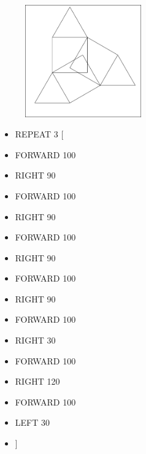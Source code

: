 \begin{minipage}{0.5\textwidth}
\begin{figure}[H]
   \includegraphics[width=5.0cm,trim=4 4 6 4,clip]{./images/marta/mar-10.png}
   \label{mar-11}
\end{figure}
\end{minipage} \hfill
\begin{minipage}{0.45\textwidth}
\begin{itemize}[itemsep=-3pt,parsep=2pt]
\item[] \hspace{0.5cm} REPEAT 3 [
\item[] \hspace{0.5cm} 	FORWARD 100
\item[] \hspace{0.5cm} 	RIGHT 90
\item[] \hspace{0.5cm} 	FORWARD 100
\item[] \hspace{0.5cm} 	RIGHT 90
\item[] \hspace{0.5cm} 	FORWARD 100
\item[] \hspace{0.5cm} 	RIGHT 90
\item[] \hspace{0.5cm} 	FORWARD 100
\item[] \hspace{0.5cm} 	RIGHT 90
\item[] \hspace{0.5cm} 	FORWARD 100
\item[] \hspace{0.5cm} 	RIGHT 30
\item[] \hspace{0.5cm} 	FORWARD 100
\item[] \hspace{0.5cm} 	RIGHT 120
\item[] \hspace{0.5cm} 	FORWARD 100
\item[] \hspace{0.5cm} 	LEFT 30
\item[] \hspace{0.5cm} 	]          
\end{itemize}          	          
\end{minipage}

